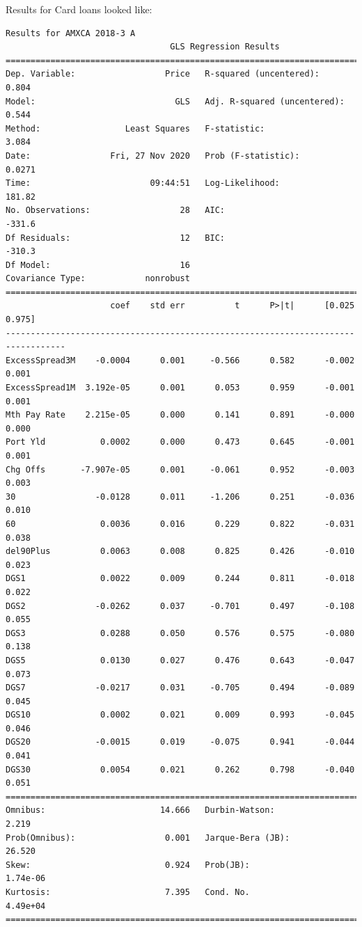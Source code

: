 \documentclass{article}
\begin{document}
Results for Card loans looked like: 

\begin{verbatim}
Results for AMXCA 2018-3 A
                                 GLS Regression Results                                
=======================================================================================
Dep. Variable:                  Price   R-squared (uncentered):                   0.804
Model:                            GLS   Adj. R-squared (uncentered):              0.544
Method:                 Least Squares   F-statistic:                              3.084
Date:                Fri, 27 Nov 2020   Prob (F-statistic):                      0.0271
Time:                        09:44:51   Log-Likelihood:                          181.82
No. Observations:                  28   AIC:                                     -331.6
Df Residuals:                      12   BIC:                                     -310.3
Df Model:                          16                                                  
Covariance Type:            nonrobust                                                  
==================================================================================
                     coef    std err          t      P>|t|      [0.025      0.975]
----------------------------------------------------------------------------------
ExcessSpread3M    -0.0004      0.001     -0.566      0.582      -0.002       0.001
ExcessSpread1M  3.192e-05      0.001      0.053      0.959      -0.001       0.001
Mth Pay Rate    2.215e-05      0.000      0.141      0.891      -0.000       0.000
Port Yld           0.0002      0.000      0.473      0.645      -0.001       0.001
Chg Offs       -7.907e-05      0.001     -0.061      0.952      -0.003       0.003
30                -0.0128      0.011     -1.206      0.251      -0.036       0.010
60                 0.0036      0.016      0.229      0.822      -0.031       0.038
del90Plus          0.0063      0.008      0.825      0.426      -0.010       0.023
DGS1               0.0022      0.009      0.244      0.811      -0.018       0.022
DGS2              -0.0262      0.037     -0.701      0.497      -0.108       0.055
DGS3               0.0288      0.050      0.576      0.575      -0.080       0.138
DGS5               0.0130      0.027      0.476      0.643      -0.047       0.073
DGS7              -0.0217      0.031     -0.705      0.494      -0.089       0.045
DGS10              0.0002      0.021      0.009      0.993      -0.045       0.046
DGS20             -0.0015      0.019     -0.075      0.941      -0.044       0.041
DGS30              0.0054      0.021      0.262      0.798      -0.040       0.051
==============================================================================
Omnibus:                       14.666   Durbin-Watson:                   2.219
Prob(Omnibus):                  0.001   Jarque-Bera (JB):               26.520
Skew:                           0.924   Prob(JB):                     1.74e-06
Kurtosis:                       7.395   Cond. No.                     4.49e+04
==============================================================================


\end{verbatim}
\end{document}
